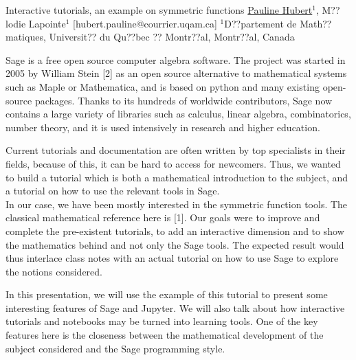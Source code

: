 


\begin{abstract_online}{Interactive tutorials, an example on symmetric functions}{%
        \underline{Pauline Hubert}$^{1}$, M??lodie Lapointe$^{1}$ }{[hubert.pauline@courrier.uqam.ca]
        }{%
        $^1$D??partement de Math??matiques, Universit?? du Qu??bec ?? Montr??al, Montr??al, Canada}
    
Sage is a free open source computer algebra software. The project was started in 2005 by William Stein [2] as an open source alternative to mathematical systems such as Maple or Mathematica, and is based on python and many existing open-source packages. Thanks to its hundreds of worldwide contributors, Sage now contains a large variety of libraries such as calculus, linear algebra, combinatorics, number theory, and it is used intensively in research and higher education. 

Current tutorials and documentation are often written by top specialists in their fields, because of this, it can be hard to access for newcomers. Thus, we wanted to build a tutorial which is both a mathematical introduction to the subject, and a tutorial on how to use the relevant tools in Sage. \\
In our case, we have been mostly interested in the symmetric function tools. The classical mathematical reference here is [1]. Our goals were to improve and complete the pre-existent tutorials, to add an interactive dimension and to show the mathematics behind and not only the Sage tools. The expected result would thus interlace class notes with an actual tutorial on how to use Sage to explore the notions considered.

In this presentation, we will use the example of this tutorial to present some interesting features of Sage and Jupyter. We will also talk about how interactive tutorials and notebooks may be turned into learning tools.
One of the key features here is the closeness between the mathematical development of the subject considered and the Sage programming style. \\



\end{abstract_online}
